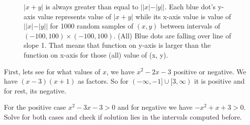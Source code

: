 \documentclass[answers,addpoints]{exam}
\begin{document}
\begin{questions}
\begin{solution}
    \begin{figure}[H]
        \centering
        \caption{ $|x+y|$ is always greater than equal to $||x|-|y||$. Each blue
            dot's y-axis value represents value of $|x+y|$ while its x-axis value is value of
            $||x|-|y||$ for 1000 random samples of $(x,y)$ between intervals of
            $(-100, 100)\times(-100,100)$. (All) Blue dots are  falling over line of slope 1.
            That means that function on  y-axis is
            larger than the function on x-axis  for those (all) value of (x, y).
        }
        \label{fig:2a}
    \end{figure}
\end{solution}


\begin{solution}

    First, lets see for what values of $x$, we have $x^2 - 2x - 3$ positive or
    negative. We have $(x-3)(x+1)$ as factors. So for $(-\infty, -1] \cup [3,
    \infty)$ it is positive and for rest, its negative.

    For the positive case $ x^2 - 3x - 3 > 0$ and for negative we have $ - x^2 + x
    + 3 > 0$. Solve for both cases and check if solution lies in the intervals
    computed before.


\end{solution}
\end{questions}
\end{document}
